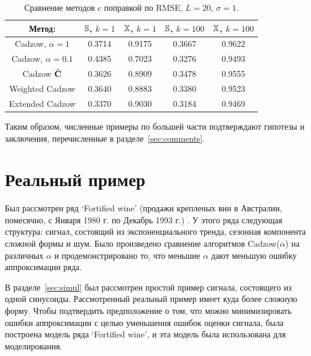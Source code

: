\documentclass[12pt, specialist, subf,href,colorlinks=true,substylefile = spbu.rtx]{disser}
\theoremstyle{remark}
\theoremstyle{definition}
\begin{document}
\begin{table}[!hhh]
	\begin{center}
		\caption{Сравнение методов c поправкой по RMSE, $L = 20$, $\sigma=1$.}\label{fintable_improved}
		\begin{tabular}{|c|c|c|c|c|}
			\hline
			Метод: & $\mathbb{S}$, $k = 1$ & $\mathbb{X}$, $k = 1$ & $\mathbb{S}$, $k = 100$ & $\mathbb{X}$, $k = 100$  \\
			\hline
			Cadzow, $\alpha = 1$ & 0.3714 & 0.9175 & 0.3667 & 0.9622 \\
			\hline
			Cadzow, $\alpha = 0.1$ & 0.4385 & 0.7023 & 0.3276 & 0.9493 \\
			\hline
			Cadzow $\hat{\mathbf{C}}$ & 0.3626 & 0.8909 & 0.3478 & 0.9555 \\
			\hline
			Weighted Cadzow & 0.3640 & 0.8883 & 0.3380 & 0.9523 \\
			\hline
			Extended Cadzow & 0.3370 & 0.9030 & 0.3184 & 0.9469 \\
			\hline
		\end{tabular}
	\end{center}
\end{table}

Таким образом, численные примеры по большей части подтверждают гипотезы и заключения, перечисленные в разделе~\ref{sec:comments}.

\section{Реальный пример}
\label{sec:ex_real}
Был рассмотрен ряд `Fortified wine' (продажи крепленых вин в Австралии, помесячно, с Января 1980 г. по Декабрь 1993 г.) \citep{HyndmanTSDL}. У этого ряда следующая структура: сигнал, состоящий из экспоненциального тренда, сезонная компонента сложной формы и шум.
Было произведено сравнение алгоритмов Cadzow($\alpha$) на различных $\alpha$ и продемонстрировано то, что меньшие $\alpha$ дают меньшую ошибку аппроксимации ряда.

В разделе~\ref{sec:simul} был рассмотрен простой пример сигнала, состоящего из одной синусоиды.
Рассмотренный реальный пример имеет куда более сложную форму. Чтобы подтвердить предположение о том, что можно минимизировать ошибки аппроксимации с целью уменьшения ошибок оценки сигнала,
была построена модель ряда `Fortified wine', и эта модель была использована для моделирования.
\end{document}
